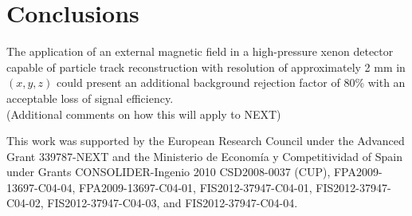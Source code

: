 \documentclass{JINST}
\begin{document}
\section{Conclusions}
The application of an external magnetic field in a high-pressure xenon detector capable of particle track reconstruction with resolution of approximately 2 mm in $(x,y,z)$ could present an additional background rejection factor of 80\% with an acceptable loss of signal efficiency.\\

(Additional comments on how this will apply to NEXT)





\acknowledgments

This work was supported by the European Research Council under the Advanced Grant 339787-NEXT and the Ministerio de Econom\'{i}a y Competitividad of Spain under Grants CONSOLIDER-Ingenio 2010 CSD2008-0037 (CUP), FPA2009-13697-C04-04, FPA2009-13697-C04-01, FIS2012-37947-C04-01, FIS2012-37947-C04-02, FIS2012-37947-C04-03, and FIS2012-37947-C04-04.


\end{document}

